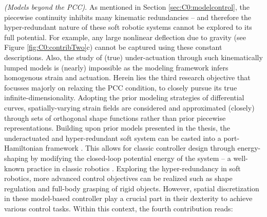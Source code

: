 \textit{(Models beyond the PCC)}. As mentioned in Section \ref{sec:C0:modelcontrol}, the piecewise continuity inhibits many kinematic redundancies -- and therefore the hyper-redundant nature of these soft robotic systems cannot be explored to its full potential. For example, any large nonlinear deflection due to gravity (see Figure \ref{fig:C0:contribTwo}c) cannot be captured using these constant descriptions. Also, the study of (true) under-actuation through such kinematically lumped models is (nearly) impossible as the modeling framework infers homogenous strain and actuation. Herein lies the third research objective that focusses majorly on relaxing the PCC condition, to closely pursue its true infinite-dimensionality. Adopting the prior modeling strategies of differential curves, spatially-varying strain fields are considered and approximated (closely) through sets of orthogonal shape functions rather than prior piecewise representations. Building upon prior models presented in the thesis, the underactuated and hyper-redundant soft system can be casted into a port-Hamiltonian framework \cite{Schaft2004,Ortega2002}. This allows for classic controller design through energy-shaping by modifying the closed-loop potential energy of the system --  a well-known practice in classic robotics \cite{Schaft2004,Ortega1998,Ortega2002}. Exploring the hyper-redundancy in soft robotics, more advanced control objectives can be realized such as shape regulation and full-body grasping of rigid objects. However, spatial discretization in these model-based controller play a crucial part in their dexterity to achieve various control tasks. Within this context, the fourth contribution reads:


